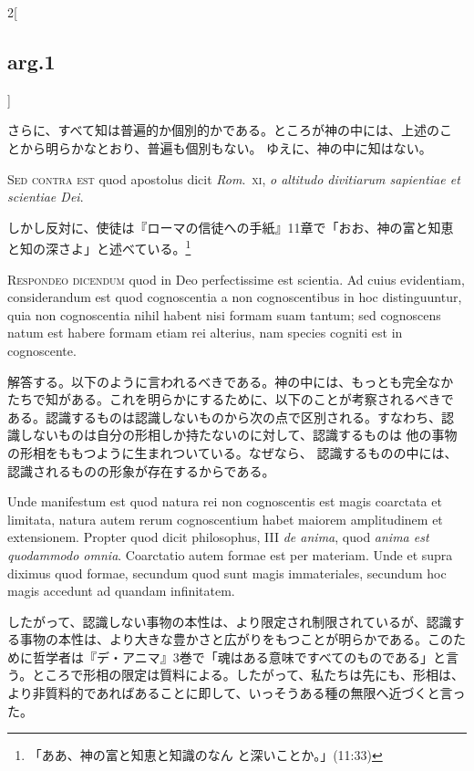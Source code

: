 \documentclass[paper=a4paper,fontsize=10pt,jafontsize=9pt,titlepage]{jlreq}
\begin{document}
\begin{paracol}{2}[\subsection{arg.1}]
\switchcolumn

さらに、すべて知は普遍的か個別的かである。ところが神の中には、上述のこ
とから明らかなとおり、普遍も個別もない。 ゆえに、神の中に知はない。

\switchcolumn*[\subsection{s.c.}]

{\scshape Sed contra est} quod apostolus dicit {\itshape
Rom}.~{\scshape xi}, {\itshape o altitudo divitiarum sapientiae et
scientiae Dei}.

\switchcolumn

しかし反対に、使徒は『ローマの信徒への手紙』11章で「おお、神の富と知恵
と知の深さよ」と述べている。\footnote{「ああ、神の富と知恵と知識のなん
と深いことか。」(11:33)}


{\scshape Respondeo dicendum} quod in Deo perfectissime est
scientia. Ad cuius evidentiam, considerandum est quod cognoscentia a
non cognoscentibus in hoc distinguuntur, quia non cognoscentia nihil
habent nisi formam suam tantum; sed cognoscens natum est habere formam
etiam rei alterius, nam species cogniti est in cognoscente.

\switchcolumn

解答する。以下のように言われるべきである。神の中には、もっとも完全なか
たちで知がある。これを明らかにするために、以下のことが考察されるべきで
ある。認識するものは認識しないものから次の点で区別される。すなわち、認
識しないものは自分の形相しか持たないのに対して、認識するものは
他の事物の形相をももつように生まれついている。なぜなら、
認識するものの中には、認識されるものの形象が存在するからである。

\switchcolumn*

Unde manifestum est quod natura rei non cognoscentis est magis
coarctata et limitata, natura autem rerum cognoscentium habet maiorem
amplitudinem et extensionem. Propter quod dicit philosophus, III
{\itshape de anima}, quod {\itshape anima est quodammodo
omnia}. Coarctatio autem formae est per materiam. Unde et supra
diximus quod formae, secundum quod sunt magis immateriales, secundum
hoc magis accedunt ad quandam infinitatem.

\switchcolumn

したがって、認識しない事物の本性は、より限定され制限されているが、認識する事物の本性は、より大きな豊かさと広がりをもつことが明らかである。このために哲学者は『デ・アニマ』3巻で「魂はある意味ですべてのものである」と言う。ところで形相の限定は質料による。したがって、私たちは先にも、形相は、より非質料的であればあることに即して、いっそうある種の無限へ近づくと言った。


\end{paracol}
\end{document}
